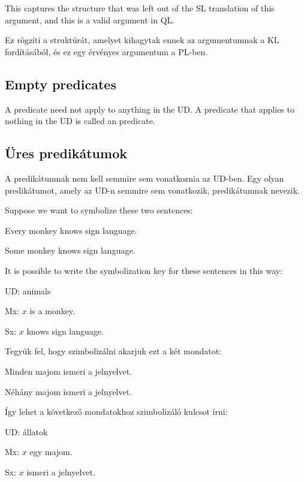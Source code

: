 This captures the structure that was left out of the SL translation of this argument, and this is a valid argument in QL.

Ez rögzíti a struktúrát, amelyet kihagytak ennek az argumentumnak a KL fordításából, és ez egy érvényes argumentum a PL-ben.







\subsection{Empty predicates}
A predicate need not apply to anything in the UD. A predicate that applies to nothing in the UD is called an  predicate.

\subsection{Üres predikátumok}
A predikátumnak nem kell semmire sem vonatkoznia az UD-ben. Egy olyan predikátumot, amely az UD-n semmire sem vonatkozik,  predikátumnak nevezik.

Suppose we want to symbolize these two sentences:
\begin{earg}
\item[\ex{monkey1}]Every monkey knows sign language.
\item[\ex{monkey2}]Some monkey knows sign language.
\end{earg}
It is possible to write the symbolization key for these sentences in this way:
\begin{ekey}
\item[UD:] animals
\item[Mx:] $x$ is a monkey.
\item[Sx:] $x$ knows sign language.
\end{ekey}

Tegyük fel, hogy szimbolizálni akarjuk ezt a két mondatot:
\begin{earg}
\item[\ex{monkey1}]Minden majom ismeri a jelnyelvet.
\item[\ex{monkey2}]Néhány majom ismeri a jelnyelvet.
\end{earg}
Így lehet a következő mondatokhoz szimbolizáló kulcsot írni:
\begin{ekey}
\item[UD:] állatok
\item[Mx:] $x$ egy majom.
\item[Sx:] $x$ ismeri a jelnyelvet.
\end{ekey}


